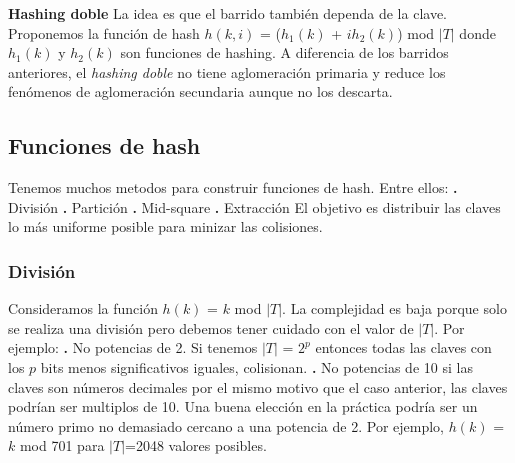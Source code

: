 \documentclass[10pt,a4paper]{article}
\begin{document}
\newline
\newline
\newline
\textbf{Hashing doble}
\newline
\newline
La idea es que el barrido también dependa de la clave.
\newline
\newline
Proponemos la función de hash $h(k,i)$ = ($h_{1}(k)$ + $i$$h_{2}(k)$) mod $|T|$ donde $h_{1}(k)$ y $h_{2}(k)$ son funciones de hashing.
\newline
\newline
A diferencia de los barridos anteriores, el \textit{hashing doble} no tiene aglomeración primaria y reduce los fenómenos de aglomeración secundaria aunque no los descarta.
\newpage

\subsection{Funciones de hash}

Tenemos muchos metodos para construir funciones de hash. Entre ellos:
\newline
\newline
\textbf{.} División
\newline
\newline
\textbf{.} Partición
\newline
\newline
\textbf{.} Mid-square
\newline
\newline
\textbf{.} Extracción
\newline
\newline
El objetivo es distribuir las claves lo más uniforme posible para minizar las colisiones.

\subsubsection{División}

Consideramos la función $h(k)$ = $k$ mod $|T|$. La complejidad es baja porque solo se realiza una división pero debemos tener cuidado con el valor de $|T|$. Por ejemplo:
\newline
\newline
\textbf{.} No potencias de 2. Si tenemos $|T|$ = $2^{p}$ entonces todas las claves con los $p$ bits menos significativos iguales, colisionan.
\newline
\newline
\textbf{.} No potencias de 10 si las claves son números decimales por el mismo motivo que el caso anterior, las claves podrían ser multiplos de 10.
\newline
\newline
Una buena elección en la práctica podría ser un número primo no demasiado cercano a una potencia de 2. Por ejemplo, $h(k)$ = $k$ mod 701 para $|T|$=2048 valores posibles.
\end{document}

